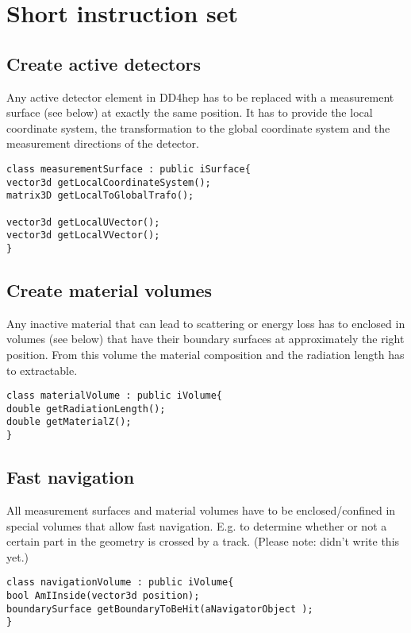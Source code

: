 \documentclass[12pt]{article}
\begin{document}
\section{Short instruction set}
\subsection{Create active detectors}
Any active detector element in DD4hep has to be replaced with a measurement surface (see below) at exactly the same position.
It has to provide the local coordinate system, the transformation to the global coordinate system and the measurement directions of the detector.
\begin{lstlisting}
class measurementSurface : public iSurface{
vector3d getLocalCoordinateSystem();
matrix3D getLocalToGlobalTrafo();

vector3d getLocalUVector();
vector3d getLocalVVector();
}
\end{lstlisting}


\subsection{Create material volumes}
Any inactive material that can lead to scattering or energy loss has to enclosed in volumes (see below) that have their boundary surfaces at approximately the right position.
From this volume the material composition and the radiation length has to extractable.
\begin{lstlisting}
class materialVolume : public iVolume{
double getRadiationLength();
double getMaterialZ();
}
\end{lstlisting}


\subsection{Fast navigation}
All measurement surfaces and material volumes have to be enclosed/confined in special volumes that allow fast navigation.
E.g. to determine whether or not a certain part in the geometry is crossed by a track.
(Please note: didn't write this yet.)
\begin{lstlisting}
class navigationVolume : public iVolume{
bool AmIInside(vector3d position);
boundarySurface getBoundaryToBeHit(aNavigatorObject );
}
\end{lstlisting}
\end{document}
